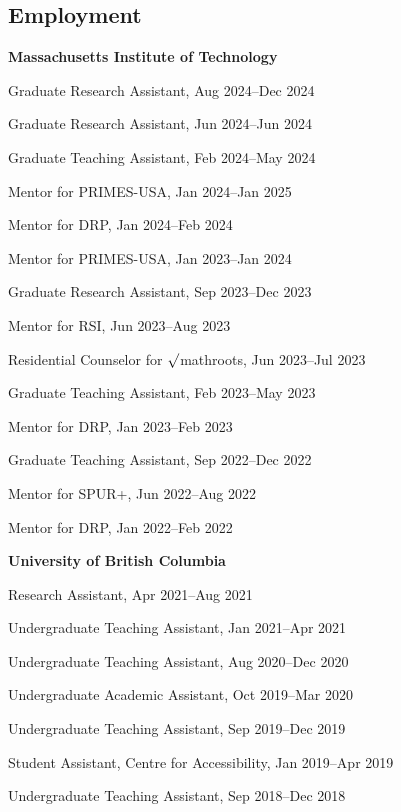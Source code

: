 \documentclass[margin,line]{res}
\newenvironment{list1}{
  \begin{list}{\ding{113}}{%
      \setlength{\itemsep}{0in}
      \setlength{\parsep}{0.025in} \setlength{\parskip}{0in}
      \setlength{\topsep}{0in} \setlength{\partopsep}{0in}
      \setlength{\leftmargin}{0.17in}}}{\end{list}}
\begin{document}
\begin{resume}
\section{\sc Employment}

{\bf Massachusetts Institute of Technology}\\
\vspace*{-.1in}
\begin{list1}
\item[] Graduate Research Assistant, Aug 2024--Dec 2024
\item[] Graduate Research Assistant, Jun 2024--Jun 2024
\item[] Graduate Teaching Assistant, Feb 2024--May 2024
\item[] Mentor for PRIMES-USA, Jan 2024--Jan 2025
\item[] Mentor for DRP, Jan 2024--Feb 2024
\item[] Mentor for PRIMES-USA, Jan 2023--Jan 2024
\item[] Graduate Research Assistant, Sep 2023--Dec 2023
\item[] Mentor for RSI, Jun 2023--Aug 2023
\item[] Residential Counselor for $\surd$mathroots, Jun 2023--Jul 2023
\item[] Graduate Teaching Assistant, Feb 2023--May 2023
\item[] Mentor for DRP, Jan 2023--Feb 2023
\item[] Graduate Teaching Assistant, Sep 2022--Dec 2022
\item[] Mentor for SPUR+, Jun 2022--Aug 2022
\item[] Mentor for DRP, Jan 2022--Feb 2022
\end{list1}

{\bf University of British Columbia}\\
\vspace*{-.1in}
\begin{list1}
\item[] Research Assistant, Apr 2021--Aug 2021 %
\item[] Undergraduate Teaching Assistant, Jan 2021--Apr 2021
\item[] Undergraduate Teaching Assistant, Aug 2020--Dec 2020
\item[] Undergraduate Academic Assistant, Oct 2019--Mar 2020
\item[] Undergraduate Teaching Assistant, Sep 2019--Dec 2019
\item[] Student Assistant, Centre for Accessibility, Jan 2019--Apr 2019
\item[] Undergraduate Teaching Assistant, Sep 2018--Dec 2018
\end{list1}


\end{resume}
\end{document}

